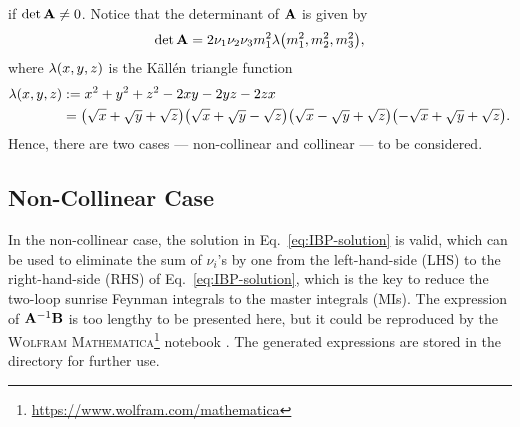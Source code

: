 \documentclass{article}
\begin{document}
        if $\det \vb{A} \neq 0$.
        Notice that the determinant of $\vb{A}$ is given by
        \begin{equation}
            \det \vb{A} = 2 \nu_1 \nu_2 \nu_3 m_1^2 \lambdaFun{m_1^2, m_2^2, m_3^2},
            \label{eq:det-A}
        \end{equation}
        where $\lambdaFun{x, y, z}$ is the Källén triangle function \cite[Eq.~(6.3)--(6.7)]{Byckling:1971ParticleKinematics}
        \begin{equation}
            \begin{aligned}
                \lambdaFun{x, y, z} & := x^2 + y^2 + z^2 - 2 x y - 2 y z - 2 z x \\
                & = \qty(\sqrt{x} + \sqrt{y} + \sqrt{z}) \qty(\sqrt{x} + \sqrt{y} - \sqrt{z}) \qty(\sqrt{x} - \sqrt{y} + \sqrt{z}) \qty(-\sqrt{x} + \sqrt{y} + \sqrt{z}).
            \end{aligned}
            \label{eq:Kallen-triangle}
        \end{equation}
        Hence, there are two cases --- non-collinear and collinear --- to be considered.

        \subsection{Non-Collinear Case}

            In the non-collinear case, the solution in Eq.~\eqref{eq:IBP-solution} is valid, which can be used to eliminate the sum of $\nu_i$'s by one from the left-hand-side (LHS) to the right-hand-side (RHS) of Eq.~\eqref{eq:IBP-solution}, which is the key to reduce the two-loop sunrise Feynman integrals to the master integrals (MIs).
            The expression of $\vb{A}^{-1} \vb{B}$ is too lengthy to be presented here, but it could be reproduced by the \textsc{Wolfram Mathematica}\footnote{\url{https://www.wolfram.com/mathematica}} notebook .
            The generated expressions are stored in the directory  for further use.
\end{document}
